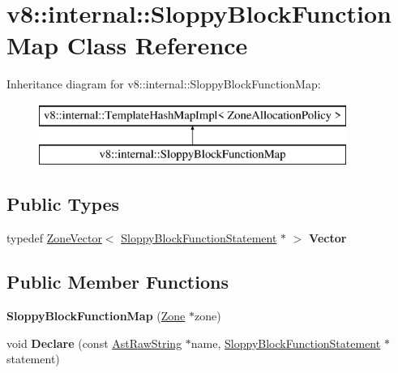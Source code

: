 \hypertarget{classv8_1_1internal_1_1_sloppy_block_function_map}{}\section{v8\+:\+:internal\+:\+:Sloppy\+Block\+Function\+Map Class Reference}
\label{classv8_1_1internal_1_1_sloppy_block_function_map}
Inheritance diagram for v8\+:\+:internal\+:\+:Sloppy\+Block\+Function\+Map\+:\begin{figure}[H]
\begin{center}
\leavevmode
\includegraphics[height=2.000000cm]{classv8_1_1internal_1_1_sloppy_block_function_map}
\end{center}
\end{figure}
\subsection*{Public Types}
\begin{DoxyCompactItemize}
\item 
typedef \hyperlink{classv8_1_1internal_1_1_zone_vector}{Zone\+Vector}$<$ \hyperlink{classv8_1_1internal_1_1_sloppy_block_function_statement}{Sloppy\+Block\+Function\+Statement} $\ast$ $>$ {\bfseries Vector}\hypertarget{classv8_1_1internal_1_1_sloppy_block_function_map_a56e967757ee5950a8a2dce7e0359f474}{}\label{classv8_1_1internal_1_1_sloppy_block_function_map_a56e967757ee5950a8a2dce7e0359f474}

\end{DoxyCompactItemize}
\subsection*{Public Member Functions}
\begin{DoxyCompactItemize}
\item 
{\bfseries Sloppy\+Block\+Function\+Map} (\hyperlink{classv8_1_1internal_1_1_zone}{Zone} $\ast$zone)\hypertarget{classv8_1_1internal_1_1_sloppy_block_function_map_a5c2875ca598de81f90f38b7237b39dbd}{}\label{classv8_1_1internal_1_1_sloppy_block_function_map_a5c2875ca598de81f90f38b7237b39dbd}

\item 
void {\bfseries Declare} (const \hyperlink{classv8_1_1internal_1_1_ast_raw_string}{Ast\+Raw\+String} $\ast$name, \hyperlink{classv8_1_1internal_1_1_sloppy_block_function_statement}{Sloppy\+Block\+Function\+Statement} $\ast$statement)\hypertarget{classv8_1_1internal_1_1_sloppy_block_function_map_aedd04f1fd7b58b17991d33b1ff1df5e4}{}\label{classv8_1_1internal_1_1_sloppy_block_function_map_aedd04f1fd7b58b17991d33b1ff1df5e4}

\end{DoxyCompactItemize}
